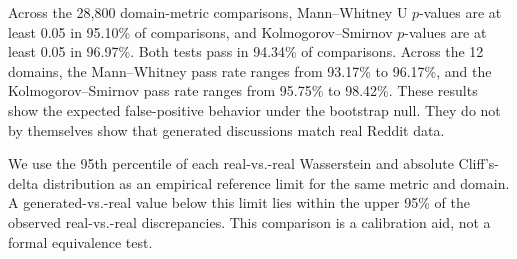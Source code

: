 Across the 28,800 domain-metric comparisons, Mann--Whitney U $p$-values are at
least 0.05 in 95.10\% of comparisons, and Kolmogorov--Smirnov $p$-values are at
least 0.05 in 96.97\%. Both tests pass in 94.34\% of comparisons. Across the
12 domains, the Mann--Whitney pass rate ranges from 93.17\% to 96.17\%, and the
Kolmogorov--Smirnov pass rate ranges from 95.75\% to 98.42\%. These results
show the expected false-positive behavior under the bootstrap null. They do
not by themselves show that generated discussions match real Reddit data.

We use the 95th percentile of each real-vs.-real Wasserstein and absolute
Cliff's-delta distribution as an empirical reference limit for the same metric
and domain. A generated-vs.-real value below this limit lies within the upper
95\% of the observed real-vs.-real discrepancies. This comparison is a
calibration aid, not a formal equivalence test.

